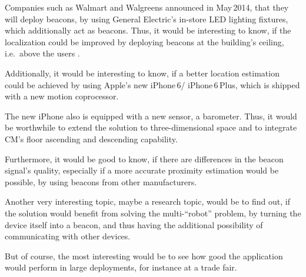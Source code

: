 Companies such as Walmart and Walgreens announced in May\,2014, that they will deploy beacons, by using General Electric's in-store LED lighting fixtures, which additionally act as beacons. Thus, it would be interesting to know, if the localization could be improved by deploying beacons at the building's ceiling, i.e.\ above the users \citep{9to5mac}.

Additionally, it would be interesting to know, if a better location estimation could be achieved by using Apple's new iPhone\,6/ iPhone\,6\,Plus, which is shipped with a new motion coprocessor.

The new iPhone also is equipped with a new sensor, a barometer. Thus, it would be worthwhile to extend the solution to three-dimensional space and to integrate \acl{CM}'s floor ascending and descending capability.

Furthermore, it would be good to know, if there are differences in the beacon signal's quality, especially if a more accurate proximity estimation would be possible, by using beacons from other manufacturers.

Another very interesting topic, maybe a research topic, would be to find out, if the solution would benefit from solving the multi-``robot'' problem, by turning the device itself into a beacon, and thus having the additional possibility of communicating with other devices.

But of course, the most interesting would be to see how good the application would perform in large deployments, for instance at a trade fair.